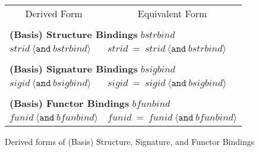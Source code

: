 \documentclass[draft]{article}
\renewcommand{\mit}[1]{\mathit{#1}}
\newcommand{\mtt}[1]{\mathtt{#1}}
\begin{document}
\begin{figure}[h]
\begin{center}
\begin{tabular}{|l|l|}
\multicolumn{1}{c}{Derived Form} &
\multicolumn{1}{c}{Equivalent Form} \\
\multicolumn{2}{c}{} \\
\multicolumn{2}{l}{\textbf{(Basis) Structure Bindings} $\mit{bstrbind}$} \\
\hline
$\mit{strid} ~\langle\mtt{and}~ \mit{bstrbind}\rangle$ &
$\mit{strid} ~\mtt{=}~ \mit{strid} ~\langle\mtt{and}~ \mit{bstrbind}\rangle$ \\
\hline
\multicolumn{2}{c}{} \\
\multicolumn{2}{l}{\textbf{(Basis) Signature Bindings} $\mit{bsigbind}$} \\
\hline
$\mit{sigid} ~\langle\mtt{and}~ \mit{bsigbind}\rangle$ &
$\mit{sigid} ~\mtt{=}~ \mit{sigid} ~\langle\mtt{and}~ \mit{bsigbind}\rangle$ \\
\hline
\multicolumn{2}{c}{} \\
\multicolumn{2}{l}{\textbf{(Basis) Functor Bindings} $\mit{bfunbind}$} \\
\hline
$\mit{funid} ~\langle\mtt{and}~ \mit{bfunbind}\rangle$ &
$\mit{funid} ~\mtt{=}~ \mit{funid} ~\langle\mtt{and}~ \mit{bfunbind}\rangle$ \\
\hline
\end{tabular}
\end{center}
\caption{Derived forms of (Basis) Structure, Signature, and Functor Bindings}\label{fig:mlb:DF:bindings}
\end{figure}



\end{document}
